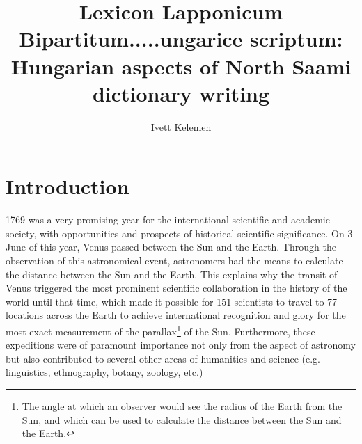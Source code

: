 \documentclass[output=paper,colorlinks,citecolor=brown,arabicfont,chinesefont]{langscibook}
\author{Ivett Kelemen\affiliation{University of Debrecen}}
\title[Hungarian aspects of North Saami dictionary writing]
      {Lexicon Lapponicum Bipartitum.....ungarice scriptum: Hungarian aspects of North Saami dictionary writing}
\begin{document}
\maketitle

\section{Introduction}

1769 was a very promising year for the international scientific and academic society, with opportunities and prospects of historical scientific significance. On 3 June of this year, Venus passed between the Sun and the Earth. Through the observation of this astronomical event, astronomers had the means to calculate the distance between the Sun and the Earth. This explains why the transit of Venus triggered the most prominent scientific collaboration in the history of the world until that time, which made it possible for 151 scientists to travel to 77 locations across the Earth to achieve international recognition and glory for the most exact measurement of the parallax\footnote{The angle at which an observer would see the radius of the Earth from the Sun, and which can be used to calculate the distance between the Sun and the Earth.} of the Sun. Furthermore, these expeditions were of paramount importance not only from the aspect of astronomy but also contributed to several other areas of humanities and science (e.g. linguistics, ethnography, botany, zoology, etc.)
\end{document}
